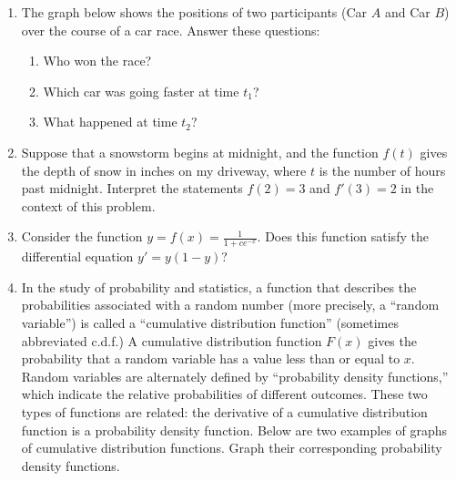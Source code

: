 \documentclass{article}
\begin{document}
\begin{enumerate}
    	\item The graph below shows the positions of two participants (Car $A$ and Car $B$) over the course of a car race. Answer these questions:
    	\begin{enumerate}
    	    \item Who won the race?
    	    \item Which car was going faster at time $t_1$?
    	    \item What happened at time $t_2$?
    	\end{enumerate}
    	\begin{center}
    	\end{center}

                  \item Suppose that a snowstorm begins at midnight, and the function $f(t)$ gives the depth of snow in inches on my driveway, where $t$ is the number of hours past midnight. Interpret the statements $f(2) = 3$ and $f'(3) = 2$ in the context of this problem.          
                 \item Consider the function $ y=f(x) = \frac{1}{1+ce^{-x}}$.  Does this function satisfy the differential equation $y'=y(1-y)$?
                 \item In the study of probability and statistics, a function that describes the probabilities associated with a random number (more precisely, a ``random variable'') is called a ``cumulative distribution function'' (sometimes abbreviated c.d.f.) A cumulative distribution function $F(x)$ gives the probability that a random variable has a value less than or equal to $x$. Random variables are alternately defined by ``probability density functions,'' which indicate the relative probabilities of different outcomes. These two types of functions are related: the derivative of a cumulative distribution function is a probability density function. Below are two examples of graphs of cumulative distribution functions. Graph their corresponding probability density functions.
                 

\end{enumerate}
\end{document}
